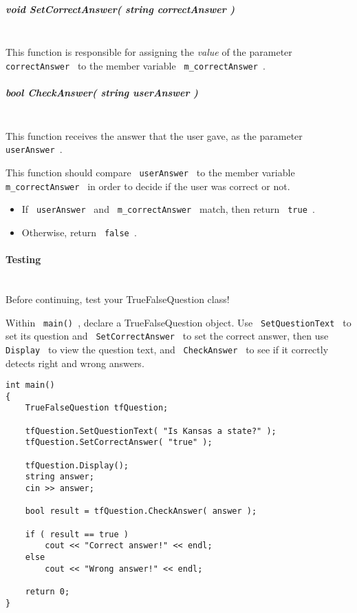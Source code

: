 \documentclass[a4paper,12pt]{book}
\begin{document}
                        \newpage
                        \subparagraph{ void SetCorrectAnswer( string correctAnswer ) }  ~\\

                            This function is responsible for assigning the \textit{ value }
                            of the parameter \texttt{ correctAnswer } to the member variable
                            \texttt{ m\_correctAnswer }.


                        \subparagraph{ bool CheckAnswer( string userAnswer ) } ~\\

                            This function receives the answer that the user gave,
                            as the parameter \texttt{ userAnswer }.

                            This function should compare \texttt{ userAnswer } to
                            the member variable \texttt{ m\_correctAnswer } in order
                            to decide if the user was correct or not.

                            \begin{itemize}
                                \item If \texttt{ userAnswer } and \texttt{ m\_correctAnswer } match, then return \texttt{ true }.
                                \item Otherwise, return \texttt{ false }.
                            \end{itemize}
                        
                    \paragraph{ Testing } ~\\
                        Before continuing, test your TrueFalseQuestion class!

                        Within \texttt{ main() }, declare a TrueFalseQuestion object.
                        Use \texttt{ SetQuestionText } to set its question and
                        \texttt{ SetCorrectAnswer } to set the correct answer,
                        then use \texttt{ Display } to view the question text,
                        and \texttt{ CheckAnswer } to see if it correctly detects
                        right and wrong answers. \newpage

\begin{lstlisting}[style=code]
int main()
{
    TrueFalseQuestion tfQuestion;

    tfQuestion.SetQuestionText( "Is Kansas a state?" );
    tfQuestion.SetCorrectAnswer( "true" );

    tfQuestion.Display();
    string answer;
    cin >> answer;

    bool result = tfQuestion.CheckAnswer( answer );

    if ( result == true )
        cout << "Correct answer!" << endl;
    else
        cout << "Wrong answer!" << endl;

    return 0;
}
\end{lstlisting}
\end{document}
